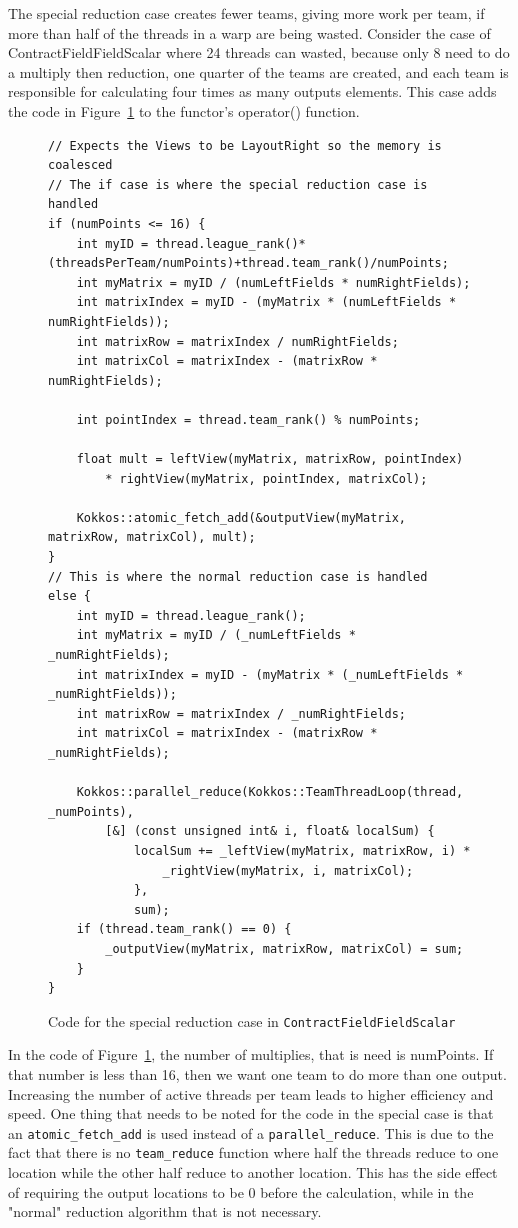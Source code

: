The special reduction case creates fewer teams, giving more work per team, if
more than half of the threads in a warp are being wasted. Consider the
case of ContractFieldFieldScalar where 24 threads can wasted, because only 8
need to do a multiply then reduction, one quarter of the teams are created, and
each team is responsible for calculating four times as many outputs elements.
This case adds the code in
Figure~\ref{lst:ContractFieldFieldScalarReductionSpecialCase} to the functor's
operator() function. \\
\begin{figure}[!ht]
    \begin{lstlisting}
// Expects the Views to be LayoutRight so the memory is coalesced
// The if case is where the special reduction case is handled
if (numPoints <= 16) {	
	int myID = thread.league_rank()*(threadsPerTeam/numPoints)+thread.team_rank()/numPoints;
	int myMatrix = myID / (numLeftFields * numRightFields);
	int matrixIndex = myID - (myMatrix * (numLeftFields * numRightFields));
	int matrixRow = matrixIndex / numRightFields;
	int matrixCol = matrixIndex - (matrixRow * numRightFields);

	int pointIndex = thread.team_rank() % numPoints;

	float mult = leftView(myMatrix, matrixRow, pointIndex) 
		* rightView(myMatrix, pointIndex, matrixCol);

	Kokkos::atomic_fetch_add(&outputView(myMatrix, matrixRow, matrixCol), mult);
}
// This is where the normal reduction case is handled
else {
	int myID = thread.league_rank();
	int myMatrix = myID / (_numLeftFields * _numRightFields);
	int matrixIndex = myID - (myMatrix * (_numLeftFields * _numRightFields));
	int matrixRow = matrixIndex / _numRightFields;
	int matrixCol = matrixIndex - (matrixRow * _numRightFields);

	Kokkos::parallel_reduce(Kokkos::TeamThreadLoop(thread, _numPoints),
		[&] (const unsigned int& i, float& localSum) {
			localSum += _leftView(myMatrix, matrixRow, i) *
				_rightView(myMatrix, i, matrixCol);
			},
			sum);
	if (thread.team_rank() == 0) {
		_outputView(myMatrix, matrixRow, matrixCol) = sum;
	}
}
    \end{lstlisting}
\caption{Code for the special reduction case in \texttt{ContractFieldFieldScalar}
\label{lst:ContractFieldFieldScalarReductionSpecialCase}} 
\end{figure}

In the code of Figure~\ref{lst:ContractFieldFieldScalarReductionSpecialCase}, the number of multiplies, that is need is numPoints. If that number is less than 16, then we want one team to do more than one output. Increasing the number of active threads per team leads to higher efficiency and speed.
One thing that needs to be noted for the code in the special case is that an
\texttt{atomic\_fetch\_add} is used instead of a \texttt{parallel\_reduce}. This is due to the fact
that there is no \texttt{team\_reduce} function where half the threads reduce to one
location while the other half reduce to another location. This has the side
effect of requiring the output locations to be 0 before the calculation, while
in the "normal" reduction algorithm that is not necessary. 

